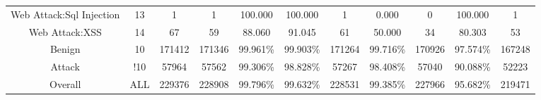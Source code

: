 \begin{table}[htb]
\begin{tabular}{@{}ccccccccccc@{}}
        Web Attack:Sql Injection &  13 &  1 &  1 &  100.000 &  100.000 &  1 &  0.000 &  0 &  100.000 &  1 \\
        Web Attack:XSS &  14 &  67 &  59 &  88.060 &  91.045 &  61 &  50.000 &  34 &  80.303 &  53 \\
        Benign &  10 &  171412 &  171346 &  99.961\% &  99.903\% &  171264 &  99.716\% &  170926 &  97.574\% &  167248 \\
        Attack &  !10 &  57964 &  57562 &  99.306\% &  98.828\% &  57267 &  98.408\% &  57040 &  90.088\% &  52223 \\
        Overall &  ALL &  229376 &  228908 &  99.796\% &  99.632\% &  228531 &  99.385\% &  227966 &  95.682\% &  219471 \\
        \bottomrule
    \end{tabular}
\end{table}